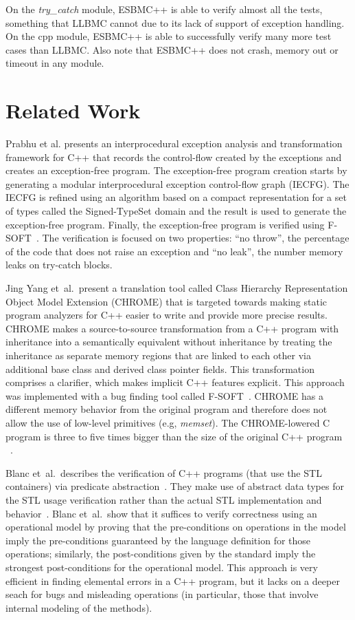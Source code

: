 \documentclass[a4paper]{llncs}
\begin{document}
On the \textit{try\_catch} module, ESBMC++ is able to verify almost all the tests,
something that LLBMC cannot due to its lack of support of exception handling. On the cpp module,
ESBMC++ is able to successfully verify many more test cases than LLBMC.
Also note that ESBMC++ does not crash, memory out or timeout in any module.

\section{Related Work}

Prabhu et al. presents an interprocedural exception
analysis and transformation framework for C++ that
records the control-flow created by the exceptions
and creates an exception-free program. The exception-free
program creation starts by generating a modular interprocedural
exception control-flow graph (IECFG). The IECFG is refined using
an algorithm based on a compact representation for a set of types
called the Signed-TypeSet domain and the result is used
to generate the exception-free program. Finally, the exception-free
program is verified using F-SOFT~\cite{Fsoft}. The verification is
focused on two properties: ``no throw'', the percentage of the code
that does not raise an exception and ``no leak'', the number memory
leaks on try-catch blocks.~\cite{PrabhuMBIG11}

Jing Yang et~al.\ present a translation tool called Class Hierarchy
Representation Object Model Extension (CHROME) that is targeted towards
making static program analyzers for C++ easier to write and provide
more precise results. CHROME makes a source-to-source transformation
from a C++ program with inheritance into a semantically equivalent without
inheritance by treating the inheritance as separate memory regions
that are linked to each other via additional base class and derived class
pointer fields. This transformation comprises a clarifier, which makes
implicit C++ features explicit. This approach was implemented with a bug
finding tool called F-SOFT~\cite{Fsoft}. CHROME has a
different memory behavior from the original program and therefore does not allow
the use of low-level primitives (e.g, \textit{memset}). The CHROME-lowered C program is
three to five times bigger than the size of the original C++ program ~\cite{Yang12}.

Blanc et~al.\ describes the verification of C++ programs (that use the STL containers)
via predicate abstraction~\cite{Blanc07}. They make use of abstract data types for the STL
usage verification rather than the actual STL implementation and behavior~\cite{Blanc07}.
Blanc et~al.\ show that it suffices to verify correctness using an operational model
by proving that the pre-conditions on operations in the model imply the pre-conditions
guaranteed by the language definition for those operations; similarly, the post-conditions
given by the standard imply the strongest post-conditions for the operational model.
This approach is very efficient in finding elemental errors in a C++ program, but it lacks
on a deeper seach for bugs and misleading operations (in particular, those that involve internal
modeling of the methods).
\end{document}
